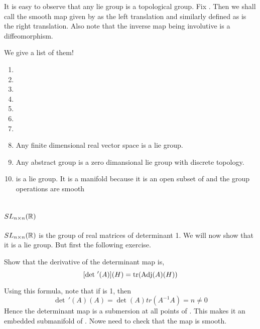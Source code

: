 \documentclass{article}
\newcommand*{\slrg}[1]{SL_{#1 \times #1}(\mathbb{R})}
\newcommand*{\glrg}[1]{GL_{#1 \times #1}(\mathbb{R})}
\begin{document}
It is easy to observe that any lie group is a topological group. Fix . Then we shall call the smooth map
 given by  as the left translation and similarly  defined as  is the right translation.
Also note that the inverse map being involutive is a diffeomorphism.

\begin{example}
    We give a list of them!
    \begin{enumerate}
        \item {}
        \item {}
        \item \mm{(\RR^*,\times)}
        \item \mm{(\CC^*,\times)}
        \item {}
        \item {}
        \item {}
        \item Any finite dimensional real vector space is a lie group.
        \item Any abstract group is a zero dimansional lie group with discrete topology.
        \item {} is a lie group. It is a manifold because it is an open subset of  and the group operations are smooth
    \end{enumerate}
\end{example}

\section{$SL_{n\times n}(\mathbb R)$}
    $SL_{n\times n}(\mathbb R)$ is the group of real matrices of determinant 1. We will now show that it is a lie group.
    But first the following exercise.
    \begin{exercise*}
        Show that the derivative of the determinant map is, $$[\det\,'(A)](H) = \operatorname{tr}(\operatorname{Adj}(A)(H))$$
    \end{exercise*}
    Using this formula, note that if  is 1, then $$\det\,'(A)(A) = \det(A) tr(A^{-1}A) =n \neq 0$$
    Hence the determinant map is a submersion at all points of . This makes it an embedded submanifold of .
    Nowe need to check that the \mm{\mu} map is smooth.

    \begin{center}
    \end{center}
    
\end{document}
